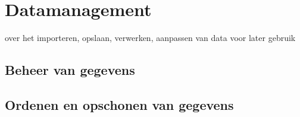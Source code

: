 \chapter{Datamanagement}
over het importeren, opslaan, verwerken, aanpassen van data voor later gebruik

\section{Beheer van gegevens}
\section{Ordenen en opschonen van gegevens}